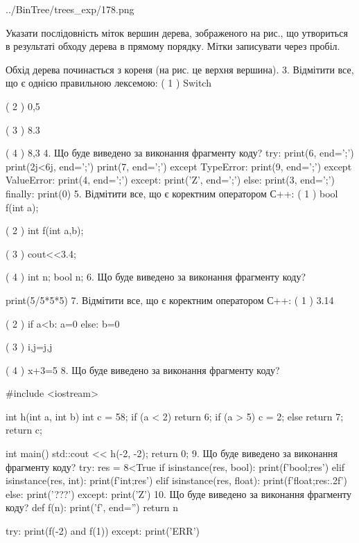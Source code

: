 \documentclass[11pt]{article}
\begin{document}
\begin{center}
	{../BinTree/trees_exp/178.png}
\end{center}
Указати послідовність міток вершин дерева, зображеного на рис., що утвориться в результаті обходу дерева в прямому порядку. Мітки записувати через пробіл.\par Обхід дерева починається з кореня (на рис. це верхня вершина).
\vspace{5mm}
3. %
Відмітити все, що є однією правильною лексемою:
( 1 ) Switch

( 2 ) 0,5

( 3 ) 8.3

( 4 ) 8,3
\vspace{5mm}
4. Що буде виведено за виконання фрагменту коду?
try:
    print(6, end=';')
    print(2j<6j, end=';')
    print(7, end=';')
except TypeError:
    print(9, end=';')
except ValueError:
    print(4, end=';')
except:
    print('Z', end=';')
else:
    print(3, end=';')
finally:
    print(0)
\vspace{5mm}
5. %
Відмітити все, що є коректним оператором С++:
( 1 ) bool f(int a);

( 2 ) int f(int a,b);

( 3 ) cout<<3.4;

( 4 ) int n; bool n;
\vspace{5mm}
6. Що буде виведено за виконання фрагменту коду?

print(5/5*5*5)
\vspace{5mm}
7. %
Відмітити все, що є коректним оператором С++:
( 1 ) 3.14%

( 2 ) if a<b: a=0 else: b=0

( 3 ) i,j=j,j

( 4 ) x+3=5
\vspace{5mm}
8. Що буде виведено за виконання фрагменту коду?

#include <iostream>

int h(int a, int b){
    int c = 58;
    if (a < 2)
        return 6;
    if (a > 5)
         c = 2;
    else 
        return 7;
    return c;
}

int main(){
    std::cout << h(-2, -2);
    return 0;
}
\vspace{5mm}
9. Що буде виведено за виконання фрагменту коду?
try:
    res = 8<True
    if isinstance(res, bool):
        print(f'bool;{res}')
    elif isinstance(res, int):
        print(f'int;{res}')
    elif isinstance(res, float):
        print(f'float;{res:.2f}')
    else:
        print('???')
except:
    print('Z')
\vspace{5mm}
10. Що буде виведено за виконання фрагменту коду?
def f(n):
    print('f', end='')
    return n

try:
    print(f(-2) and f(1))
except:
    print('ERR')
\vspace{5mm}










\newpage
\end{document}
